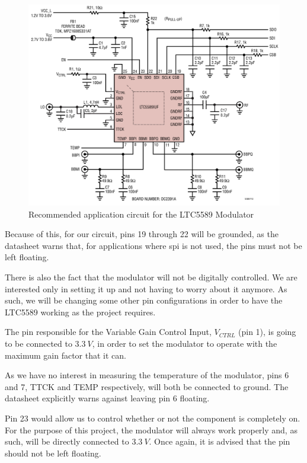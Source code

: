 \begin{figure}[H]
    \vspace*{0cm}
    \centering
    \includegraphics[width=0.7\linewidth]{figs/ch3_LTC5589_application.png}
    \caption{Recommended application circuit for the LTC5589 Modulator \cite{LTC5589}}
    \label{fig:ch3_LTC5589_application.png}
\end{figure}

\par Because of this, for our circuit, pins 19 through 22 will be grounded, as the datasheet warns that, for applications where \ac{spi} is not used, the pins must not be left floating.

\par There is also the fact that the modulator will not be digitally controlled. We are interested only in setting it up and not having to worry about it anymore. As such, we will be changing some other pin configurations in order to have the LTC5589 working as the project requires.

\par The pin responsible for the Variable Gain Control Input, $V_{CTRL}$ (pin 1), is going to be connected to $3.3\:\si{V}$, in order to set the modulator to operate with the maximum gain factor that it can.

\par As we have no interest in measuring the temperature of the modulator, pins 6 and 7, TTCK and TEMP respectively, will both be connected to ground. The datasheet explicitly warns against leaving pin 6 floating.

\par Pin 23 would allow us to control whether or not the component is completely on. For the purpose of this project, the modulator will always work properly and, as such, will be directly connected to $3.3\:\si{V}$. Once again, it is advised that the pin should not be left floating.

